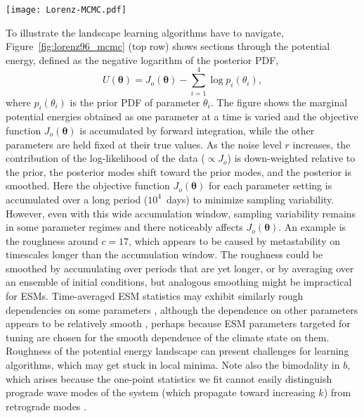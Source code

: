 \documentclass[draft]{agujournal}
\renewcommand{\vec}[1]{\boldsymbol{{#1}}}
\begin{document}
\begin{figure*}[htb] %
   \centering
   \texttt{[image: Lorenz-MCMC.pdf]}
   \caption{Probability density functions for parameter learning in Lorenz-96 model. First row: Marginal potential energies (negative logarithm of posterior PDF) at different noise levels $r$. Each marginal potential energy is obtained by varying the parameter on the abscissa, while holding other parameters fixed at their true values. Second row: Marginal prior and posterior PDFs, estimated by MCMC from the full dynamics \eqref{e:l96_slow}--\eqref{e:l96_fast},  with noise level $r=0.5$ and accumulating over $T=100~\mathrm{days}$ for each sample. Third row: Marginal prior and posterior PDFs, estimated by MCMC from the fast dynamics \eqref{e:l96_fast} only, likewise with noise level $r'=0.5$ but accumulating over only $T'=20~\mathrm{days}$ for each sample.}
   \label{fig:lorenz96_mcmc}
\end{figure*}
To illustrate the landscape learning algorithms have to navigate, Figure~\ref{fig:lorenz96_mcmc} (top row) shows sections through the potential energy, defined as the negative logarithm of the posterior PDF,
\begin{equation}
U(\vec{\theta}) = J_o(\vec{\theta}) - \sum_{i=1}^4 \log p_i(\theta_i),
\end{equation}
where $p_i(\theta_i)$ is the prior PDF of parameter $\theta_i$. The figure shows the marginal potential energies obtained as one parameter at a time is varied and the objective function $J_o(\vec{\theta})$ is accumulated by forward integration, while the other parameters are held fixed at their true values. As the noise level $r$ increases, the contribution of the log-likelihood of the data ($\propto J_o$) is down-weighted relative to the prior, the posterior modes shift toward the prior modes, and the posterior is smoothed. Here the objective function $J_o(\vec{\theta})$ for each parameter setting is accumulated over a long period ($10^4$~days) to minimize sampling variability. However, even with this wide accumulation window, sampling variability remains in some parameter regimes and there noticeably affects $J_o(\vec{\theta})$. An example is the roughness around $c=17$, which appears to be caused by metastability on timescales longer than the accumulation window.  The roughness could be smoothed by accumulating over periods that are yet longer, or by averaging over an ensemble of initial conditions, but analogous smoothing might be impractical for ESMs. Time-averaged ESM statistics may exhibit similarly rough dependencies on some parameters \citep[e.g.,][]{Suzuki13a,Zhao16a}, although the dependence on other parameters appears to be relatively smooth \citep[e.g.,][]{Neelin10a}, perhaps because ESM parameters targeted for tuning are chosen for the smooth dependence of the climate state on them. Roughness of the potential energy landscape can present challenges for learning algorithms, which may get stuck in local minima. Note also the bimodality in $b$, which arises because the one-point statistics we fit cannot easily distinguish prograde wave modes of the system (which propagate toward increasing $k$) from retrograde modes \citep[cf.][]{Lorenz98a}.
\end{document}
